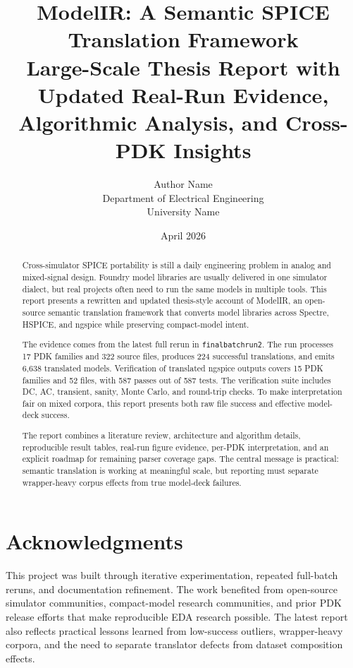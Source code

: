 \documentclass[12pt,a4paper,oneside]{report}
\title{\textbf{ModelIR: A Semantic SPICE Translation Framework}\\
Large-Scale Thesis Report with Updated Real-Run Evidence,\\
Algorithmic Analysis, and Cross-PDK Insights}
\author{Author Name\\Department of Electrical Engineering\\University Name}
\date{April 2026}
\begin{document}
\maketitle
{}

\begin{abstract}
Cross-simulator SPICE portability is still a daily engineering problem in analog and mixed-signal design. Foundry model libraries are usually delivered in one simulator dialect, but real projects often need to run the same models in multiple tools. This report presents a rewritten and updated thesis-style account of ModelIR, an open-source semantic translation framework that converts model libraries across Spectre, HSPICE, and ngspice while preserving compact-model intent.

The evidence comes from the latest full rerun in \texttt{finalbatchrun2}. The run processes 17 PDK families and 322 source files, produces 224 successful translations, and emits 6,638 translated models. Verification of translated ngspice outputs covers 15 PDK families and 52 files, with 587 passes out of 587 tests. The verification suite includes DC, AC, transient, sanity, Monte Carlo, and round-trip checks. To make interpretation fair on mixed corpora, this report presents both raw file success and effective model-deck success.

The report combines a literature review, architecture and algorithm details, reproducible result tables, real-run figure evidence, per-PDK interpretation, and an explicit roadmap for remaining parser coverage gaps. The central message is practical: semantic translation is working at meaningful scale, but reporting must separate wrapper-heavy corpus effects from true model-deck failures.
\end{abstract}

\chapter*{Acknowledgments}
This project was built through iterative experimentation, repeated full-batch reruns, and documentation refinement. The work benefited from open-source simulator communities, compact-model research communities, and prior PDK release efforts that make reproducible EDA research possible. The latest report also reflects practical lessons learned from low-success outliers, wrapper-heavy corpora, and the need to separate translator defects from dataset composition effects.

\tableofcontents
\listoffigures
\listoftables
\end{document}

